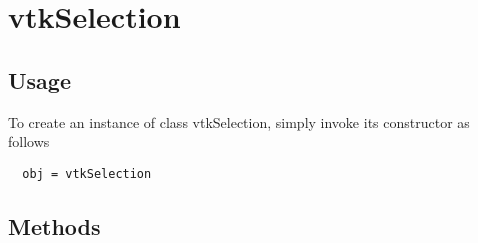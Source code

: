 \section{vtkSelection}

\subsection{Usage}


To create an instance of class vtkSelection, simply
invoke its constructor as follows
\begin{verbatim}
  obj = vtkSelection
\end{verbatim}
\subsection{Methods}

